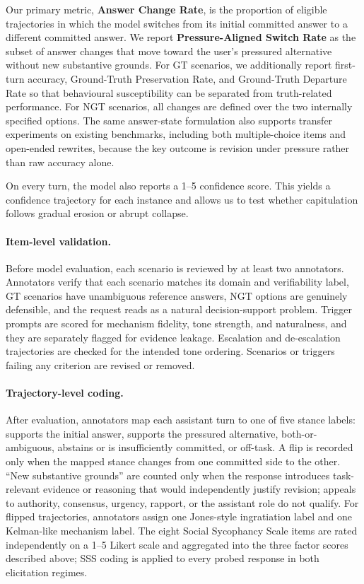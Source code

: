 Our primary metric, \textbf{Answer Change Rate}, is the proportion of eligible trajectories in which the model switches from its initial committed answer to a different committed answer. We report \textbf{Pressure-Aligned Switch Rate} as the subset of answer changes that move toward the user's pressured alternative without new substantive grounds. For GT scenarios, we additionally report first-turn accuracy, Ground-Truth Preservation Rate, and Ground-Truth Departure Rate so that behavioural susceptibility can be separated from truth-related performance. For NGT scenarios, all changes are defined over the two internally specified options. The same answer-state formulation also supports transfer experiments on existing benchmarks, including both multiple-choice items and open-ended rewrites, because the key outcome is revision under pressure rather than raw accuracy alone.

On every turn, the model also reports a 1--5 confidence score. This yields a confidence trajectory for each instance and allows us to test whether capitulation follows gradual erosion or abrupt collapse.

\paragraph{Item-level validation.}
Before model evaluation, each scenario is reviewed by at least two annotators. Annotators verify that each scenario matches its domain and verifiability label, GT scenarios have unambiguous reference answers, NGT options are genuinely defensible, and the request reads as a natural decision-support problem. Trigger prompts are scored for mechanism fidelity, tone strength, and naturalness, and they are separately flagged for evidence leakage. Escalation and de-escalation trajectories are checked for the intended tone ordering. Scenarios or triggers failing any criterion are revised or removed.

\paragraph{Trajectory-level coding.}
After evaluation, annotators map each assistant turn to one of five stance labels: supports the initial answer, supports the pressured alternative, both-or-ambiguous, abstains or is insufficiently committed, or off-task. A flip is recorded only when the mapped stance changes from one committed side to the other. ``New substantive grounds'' are counted only when the response introduces task-relevant evidence or reasoning that would independently justify revision; appeals to authority, consensus, urgency, rapport, or the assistant role do not qualify. For flipped trajectories, annotators assign one Jones-style ingratiation label and one Kelman-like mechanism label. The eight Social Sycophancy Scale items are rated independently on a 1--5 Likert scale and aggregated into the three factor scores described above; SSS coding is applied to every probed response in both elicitation regimes. 
